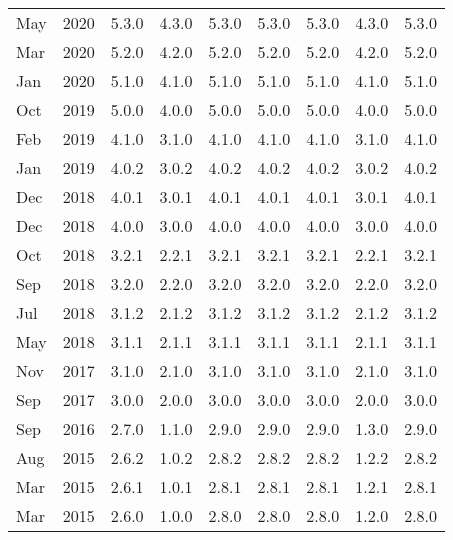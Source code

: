 \begin{xtabular}{|ll|c|c|c|c|c|c|c|}
May & 2020 & 5.3.0 & 4.3.0 & 5.3.0 & 5.3.0 & 5.3.0 & 4.3.0 & 5.3.0 \\
Mar & 2020 & 5.2.0 & 4.2.0 & 5.2.0 & 5.2.0 & 5.2.0 & 4.2.0 & 5.2.0 \\
Jan & 2020 & 5.1.0 & 4.1.0 & 5.1.0 & 5.1.0 & 5.1.0 & 4.1.0 & 5.1.0 \\
Oct & 2019 & 5.0.0       & 4.0.0       & 5.0.0         & 5.0.0       & 5.0.0       & 4.0.0       & 5.0.0\\
Feb & 2019 & 4.1.0       & 3.1.0       & 4.1.0         & 4.1.0       & 4.1.0       & 3.1.0       & 4.1.0\\
Jan & 2019 & 4.0.2       & 3.0.2       & 4.0.2         & 4.0.2       & 4.0.2       & 3.0.2       & 4.0.2\\
Dec & 2018 & 4.0.1       & 3.0.1       & 4.0.1         & 4.0.1       & 4.0.1       & 3.0.1       & 4.0.1\\
Dec & 2018 & 4.0.0       & 3.0.0       & 4.0.0         & 4.0.0       & 4.0.0       & 3.0.0       & 4.0.0\\
Oct & 2018 & 3.2.1       & 2.2.1       & 3.2.1         & 3.2.1       & 3.2.1       & 2.2.1       & 3.2.1\\
Sep & 2018 & 3.2.0       & 2.2.0       & 3.2.0         & 3.2.0       & 3.2.0       & 2.2.0       & 3.2.0\\
Jul & 2018 & 3.1.2       & 2.1.2       & 3.1.2         & 3.1.2       & 3.1.2       & 2.1.2       & 3.1.2\\
May & 2018 & 3.1.1       & 2.1.1       & 3.1.1         & 3.1.1       & 3.1.1       & 2.1.1       & 3.1.1\\
Nov & 2017 & 3.1.0       & 2.1.0       & 3.1.0         & 3.1.0       & 3.1.0       & 2.1.0       & 3.1.0\\
Sep & 2017 & 3.0.0       & 2.0.0       & 3.0.0         & 3.0.0       & 3.0.0       & 2.0.0       & 3.0.0\\
Sep & 2016 & 2.7.0       & 1.1.0       & 2.9.0         & 2.9.0       & 2.9.0       & 1.3.0       & 2.9.0\\
Aug & 2015 & 2.6.2       & 1.0.2       & 2.8.2         & 2.8.2       & 2.8.2       & 1.2.2       & 2.8.2\\
Mar & 2015 & 2.6.1       & 1.0.1       & 2.8.1         & 2.8.1       & 2.8.1       & 1.2.1       & 2.8.1\\
Mar & 2015 & 2.6.0       & 1.0.0       & 2.8.0         & 2.8.0       & 2.8.0       & 1.2.0       & 2.8.0\\

\end{xtabular}

